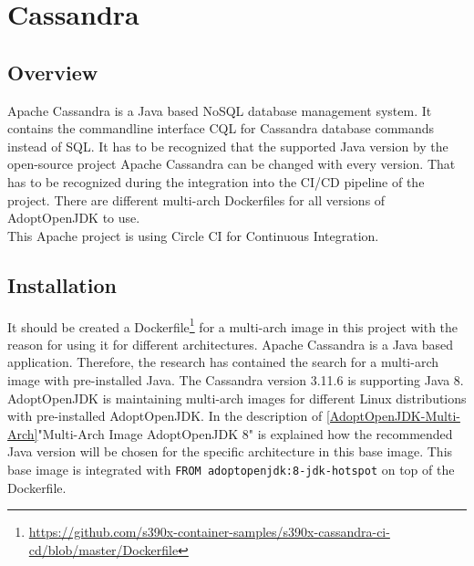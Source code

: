 \chapter{Cassandra}\label{ch:cassandra}

\section{Overview}

Apache Cassandra is a Java based NoSQL database management system. It contains the commandline interface CQL for Cassandra database commands instead of SQL. It has to be recognized that the supported Java version by the open-source project Apache Cassandra can be changed with every version. That has to be recognized during the integration into the CI/CD pipeline of the project. There are different multi-arch Dockerfiles for all versions of AdoptOpenJDK to use. \\ 
This Apache project is using Circle CI for Continuous Integration.

\section{Installation}\label{Cassandra-Installation}

It should be created a Dockerfile\footnote{\url{https://github.com/s390x-container-samples/s390x-cassandra-ci-cd/blob/master/Dockerfile}} for a multi-arch image in this project with the reason for using it for different architectures.
Apache Cassandra is a Java based application. Therefore, the research has contained the search for a multi-arch image with pre-installed Java. The Cassandra version 3.11.6 is supporting Java 8. 
AdoptOpenJDK is maintaining multi-arch images for different Linux distributions with pre-installed AdoptOpenJDK.
In the description of \ref{AdoptOpenJDK-Multi-Arch}"Multi-Arch Image AdoptOpenJDK 8" is explained how the recommended Java version will be chosen for the specific architecture in this base image. 
This base image is integrated with \lstinline!FROM adoptopenjdk:8-jdk-hotspot! on top of the Dockerfile.

